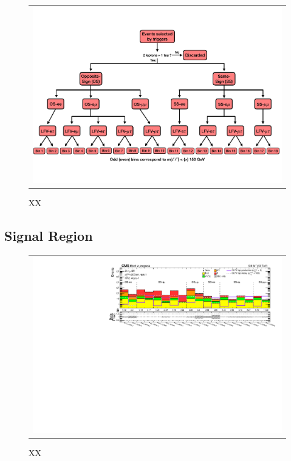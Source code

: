 \begin{figure}[tbh!]
 \begin{center}
 \begin{tabular}{c}
 \includegraphics[width=\textwidth]{figures/Part4/ObjEvt/SRFlowChart}
 \end{tabular}
 \caption{XX}
 \label{fig:EvtCat}
 \end{center}
 \end{figure}

\subsection{Signal Region}
\label{subsec:SR}

\begin{figure}[tbh!]
 \begin{center}
 \begin{tabular}{c}
 \includegraphics[width=\textwidth]{figures/Part4/ObjEvt/Summary_llOffZMetg20B1}
 \end{tabular}
 \caption{XX}
 \label{fig:Summary}
 \end{center}
 \end{figure}
 
